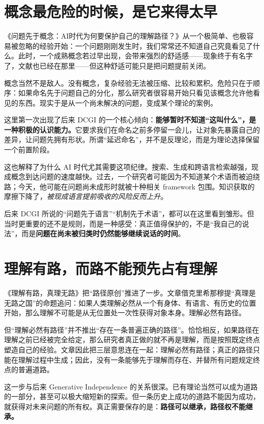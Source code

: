 \documentclass[UTF8,zihao=-4,fontset=none,oneside,openany]{ctexbook}
\begin{document}
\section{概念最危险的时候，是它来得太早}

《问题先于概念：AI时代为何要保护自己的理解路径？》从一个极简单、也极容易被忽略的经验开始：一个问题刚刚发生时，我们常常还不知道自己究竟看见了什么。此时，一个成熟概念若过早出现，会带来强烈的舒适感——现象终于有名字了，文献也已经在那里——但这种舒适可能只是把问题提前关闭。\citep{peng-problem}

概念当然不是敌人。没有概念，复杂经验无法被压缩、比较和累积。危险只在于顺序：如果命名先于问题自己的分化，那么研究者很容易开始只看见该概念允许他看见的东西。现实于是从一个尚未解决的问题，变成某个理论的案例。

这里第一次出现了后来 DCGI 的一个核心倾向：\textbf{能够暂时不知道“这叫什么”，是一种积极的认识能力。}它要求我们在命名之前多停留一会儿，让对象先暴露自己的差异，让问题先拥有形状。所谓“延迟命名”，并不是反理论，而是为理论选择保留一个前置阶段。

这也解释了为什么 AI 时代尤其需要这项纪律。搜索、生成和跨语言检索越强，现成概念到达问题的速度越快。过去，一个研究者可能因为不知道某个术语而被迫绕路；今天，他可能在问题尚未成形时就被十种相关 framework 包围。知识获取的摩擦下降了，\emph{被现成语言提前吸收的风险反而上升}。

后来 DCGI 所说的“问题先于语言”“机制先于术语”，都可以在这里看到雏形。但当时更重要的还不是规则，而是一种感受：真正值得保护的，不是“我自己的说法”，而是\textbf{问题在尚未被归类时仍然能够继续说话的时间}。

\section{理解有路，而路不能预先占有理解}

《理解有路，真理无路》把“路径原创”推进了一步。文章借克里希那穆提“真理是无路之国”的命题追问：如果人类理解必然从一个有身体、有语言、有历史的位置开始，那么理解不可能是从无位置处一次性获得对象本身。理解必然有路径。\citep{peng-path}

但“理解必然有路径”并不推出“存在一条普遍正确的路径”。恰恰相反，如果路径在理解之前已经被完全给定，那么研究者真正做的就不再是理解，而是按照既定终点塑造自己的经验。文章因此把三层意思连在一起：理解必然有路径；真正的路径只能在理解过程中生成；因此，没有一条能够先于理解而存在、并替所有问题规定终点的普遍道路。

这一步与后来 Generative Independence 的关系很深。已有理论当然可以成为道路的一部分，甚至可以极大缩短新的探索。但一条历史上成功的道路不能因为成功，就获得对未来问题的所有权。真正需要保存的是：\textbf{路径可以继承，路径权不能继承。}
\end{document}
